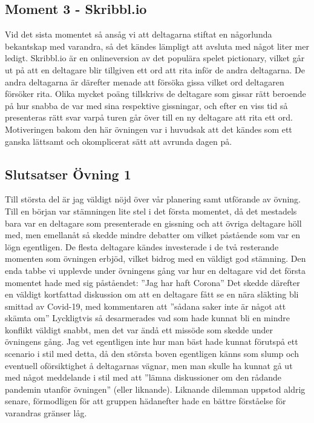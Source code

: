 \documentclass[a4paper, titlepage,12pt]{article}
\begin{document}
		\subsection{Moment 3 - Skribbl.io}
			Vid det sista momentet så ansåg vi att deltagarna stiftat en någorlunda bekantskap med varandra, så det kändes lämpligt att avsluta med något liter mer ledigt. Skribbl.io är en onlineversion av det populära spelet pictionary, vilket går ut på att en deltagare blir tillgiven ett ord att rita inför de andra deltagarna. De andra deltagarna är därefter menade att försöka gissa vilket ord deltagaren försöker rita. Olika mycket poäng tillskrivs de deltagare som gissar rätt beroende på hur snabba de var med sina respektive gissningar, och efter en viss tid så presenteras rätt svar varpå turen går över till en ny deltagare att rita ett ord.\\

			Motiveringen bakom den här övningen var i huvudsak att det kändes som ett ganska lättsamt och okomplicerat sätt att avrunda dagen på.

		\subsection{Slutsatser Övning 1}
			Till största del är jag väldigt nöjd över vår planering samt utförande av övning. Till en början var stämningen lite stel i det första momentet, då det mestadels bara var en deltagare som presenterade en gissning och att övriga deltagare höll med, men emellanåt så skedde mindre debatter om vilket påstående som var en lögn egentligen. De flesta deltagare kändes investerade i de två resterande momenten som övningen erbjöd, vilket bidrog med en väldigt god stämning. Den enda tabbe vi upplevde under övningens gång var hur en deltagare vid det första momentet hade med sig påståendet: ''Jag har haft Corona'' Det skedde därefter en väldigt kortfattad diskussion om att en deltagare fått se en nära släkting bli smittad av Covid-19, med kommentaren att ''sådana saker inte är något att skämta om'' Lyckligtvis så desarmerades vad som hade kunnat bli en mindre konflikt väldigt snabbt, men det var ändå ett missöde som skedde under övningens gång. Jag vet egentligen inte hur man bäst hade kunnat förutspå ett scenario i stil med detta, då den största boven egentligen känns som slump och eventuell oförsiktighet å deltagarnas vägnar, men man skulle ha kunnat gå ut med något meddelande i stil med att ''lämna diskussioner om den rådande pandemin utanför övningen'' (eller liknande). Liknande dilemman uppstod aldrig senare, förmodligen för att gruppen hädanefter hade en bättre förståelse för varandras gränser låg.
\end{document}
